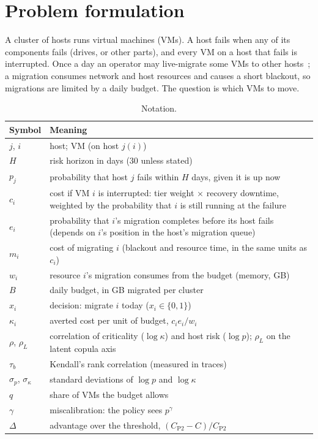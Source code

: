 
\section{Problem formulation}
\label{sec:problem}

A cluster of hosts runs virtual machines (VMs). A host fails when any of its components fails
(drives, or other parts), and every VM on a host that fails is interrupted. Once a day an
operator may live-migrate some VMs to other hosts~\cite{clark2005live}; a migration consumes
network and host resources and causes a short blackout, so migrations are limited by a daily
budget. The question is which VMs to move.

\begin{table}[t]
  \centering
  \small
  \begin{tabular}{@{}ll@{}}
    \toprule
    Symbol & Meaning \\
    \midrule
    $j$, $i$ & host; VM (on host $j(i)$) \\
    $H$ & risk horizon in days (30 unless stated) \\
    $p_j$ & probability that host $j$ fails within $H$ days, given it is up now \\
    $c_i$ & cost if VM $i$ is interrupted: tier weight $\times$ recovery downtime, weighted by the
            probability that $i$ is still running at the failure \\
    $e_i$ & probability that $i$'s migration completes before its host fails (depends on $i$'s
            position in the host's migration queue) \\
    $m_i$ & cost of migrating $i$ (blackout and resource time, in the same units as $c_i$) \\
    $w_i$ & resource $i$'s migration consumes from the budget (memory, GB) \\
    $B$ & daily budget, in GB migrated per cluster \\
    $x_i$ & decision: migrate $i$ today ($x_i \in \{0,1\}$) \\
    $\kappa_i$ & averted cost per unit of budget, $c_i e_i / w_i$ \\
    $\rho$, $\rho_L$ & correlation of criticality ($\log\kappa$) and host risk ($\log p$); $\rho_L$ on the latent copula axis \\
    $\tau_b$ & Kendall's rank correlation (measured in traces) \\
    $\sigma_p$, $\sigma_\kappa$ & standard deviations of $\log p$ and $\log\kappa$ \\
    $q$ & share of VMs the budget allows \\
    $\gamma$ & miscalibration: the policy sees $p^\gamma$ \\
    $\Delta$ & advantage over the threshold, $(C_{\mathrm{P2}} - C)/C_{\mathrm{P2}}$ \\
    \bottomrule
  \end{tabular}
  \caption{Notation.}
  \label{tab:notation}
\end{table}

